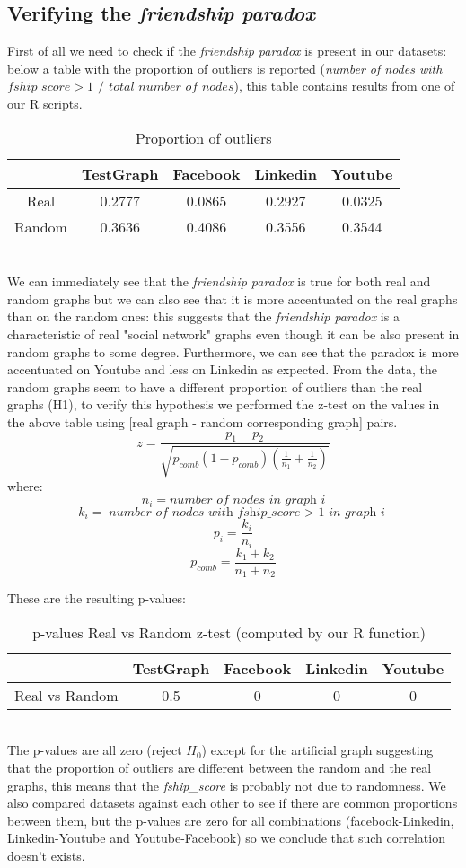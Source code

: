 \documentclass{article}
\begin{document}
\subsection{Verifying the \textit{friendship paradox}}
First of all we need to check if the \textit{friendship paradox} is present in our datasets: below a table with the proportion of outliers is reported (\textit{number of nodes with $fship\_score > 1$ $/$ $total\_number\_of\_nodes$}), this table contains results from one of our R scripts. 
\begin{table}[ht]
\centering
\begin{tabular}{|c|c|c|c|c|}
\hline
& TestGraph & Facebook & Linkedin & Youtube \\ \hline
Real & 0.2777 & 0.0865 & 0.2927 & 0.0325\\ \hline
Random & 0.3636 & 0.4086 & 0.3556 & 0.3544 \\ \hline
\end{tabular}
\caption{Proportion of outliers}
\end{table} 
\\

We can immediately see that the \textit{friendship paradox} is true for both real and random graphs but we can also see that it is more accentuated on the real graphs than on the random ones: this suggests that the \textit{friendship paradox} is a characteristic of real "social network" graphs even though it can be also present in random graphs to some degree. Furthermore, we can see that the paradox is more accentuated on Youtube and less on Linkedin as expected. From the data, the random graphs seem to have a different proportion of outliers than the real graphs (H1), to verify this hypothesis we performed the z-test on the values in the above table using [real graph - random corresponding graph] pairs.
\[z = \frac{p_1 - p_2}{\sqrt{p_{comb} (1 - p_{comb}) \left( \frac{1}{n_1} + \frac{1}{n_2} \right)}}\]
where:
\[n_i = \textit{number of nodes in graph i}\]
\[k_i = \textit{number of nodes with fship\_score $>$ 1 in graph i}\]
\[p_i = \frac{k_i}{n_i}\]
\[p_{comb} = \frac{k_1 + k_2}{n_1 + n_2}\]


These are the resulting p-values: \\
\begin{table}[ht]
\centering
\begin{tabular}{|c|c|c|c|c|}
\hline
& TestGraph & Facebook & Linkedin & Youtube \\ \hline
Real vs Random & 0.5 & 0 & 0 & 0\\ \hline
\end{tabular}
\caption{p-values Real vs Random z-test (computed by our R function)}
\end{table} 
\\
The p-values are all zero (reject \(H_0\)) except for the artificial graph suggesting that the proportion of outliers are different between the random and the real graphs, this means that the \textit{fship\_score} is probably not due to randomness. We also compared datasets against each other to see if there are common proportions between them, but the p-values are zero for all combinations (facebook-Linkedin, Linkedin-Youtube and Youtube-Facebook) so we conclude that such correlation doesn't exists.
\end{document}
